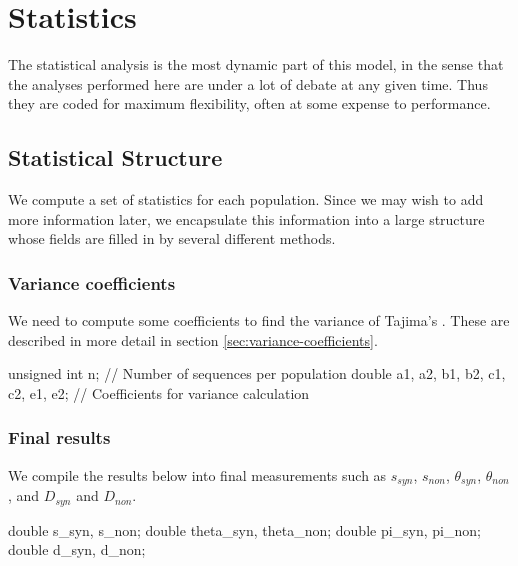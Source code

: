 \documentclass{article}
\begin{document}
  \section{Statistics}
    \label{sec:statistics}

    The statistical analysis is the most dynamic part of this model, in the
    sense that the analyses performed here are under a lot of debate at any
    given time. Thus they are coded for maximum flexibility, often at some
    expense to performance.

    \subsection{Statistical Structure}
      \label{sec:statistical-structure}

      We compute a set of statistics for each population. Since we may wish to
      add more information later, we encapsulate this information into a large
      structure whose fields are filled in by several different methods.

\begin{ccode}
typedef struct {
\end{ccode}

      \subsubsection{Variance coefficients}

	We need to compute some coefficients to find the variance of Tajima's
	\D{}. These are described in more detail in section
	\ref{sec:variance-coefficients}.

\begin{ccode}
  unsigned int		n;     		// Number of sequences per population
  double		a1, a2, b1, b2,
			c1, c2, e1, e2;	// Coefficients for variance calculation
\end{ccode}

      \subsubsection{Final results}

	We compile the results below into final measurements such as $s_{syn}$,
	$s_{non}$, $\theta_{syn}$, $\theta_{non}$, and $D_{syn}$ and $D_{non}$.

\begin{ccode}
  double		s_syn,		s_non;
  double		theta_syn,	theta_non;
  double		pi_syn,		pi_non;
  double		d_syn,		d_non;
\end{ccode}
\end{document}

